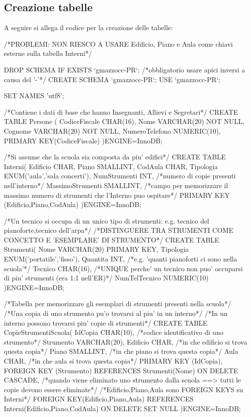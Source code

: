 \documentclass{article}
\begin{document}
\subsection{Creazione tabelle}
\begin{small}
A seguire si allega il codice per la creazione delle tabelle:  \bigskip

\begin{sql}
/*PROBLEMI: NON RIESCO A USARE Edificio, Piano e Aula come chiavi esterne sulla tabella Interni*/

DROP SCHEMA IF EXISTS `gmazzocc-PR`;     /*obbligatorio usare apici inversi a causa del '-'*/
CREATE SCHEMA `gmazzocc-PR`; USE `gmazzocc-PR`;

SET NAMES 'utf8';


/*Contiene i dati di base che hanno Insegnanti, Allievi e Segretari*/
CREATE TABLE Persone (
	CodiceFiscale CHAR(16),
	Nome	      VARCHAR(20) NOT NULL,
	Cognome	      VARCHAR(20) NOT NULL,
	NumeroTelefono NUMERIC(10),
	PRIMARY KEY(CodiceFiscale)
)ENGINE=InnoDB;

/*Si assume che la scuola sia composta da piu' edifici*/
CREATE TABLE Interni(
	Edificio CHAR,
	Piano	 SMALLINT,
	CodAula	 CHAR,
	Tipologia ENUM('aula','sala concerti'), 
	NumStrumenti INT,	/*numero di copie presenti nell'interno*/
	MassimoStrumenti SMALLINT,	/*campo per memorizzare il massimo numero di strumenti che l'Interno puo ospitare*/	
	PRIMARY KEY (Edificio,Piano,CodAula)
)ENGINE=InnoDB;

/*Un tecnico si occupa di un unico tipo di strumenti: e.g. tecnico del pianoforte,tecnico dell'arpa*/
/*DISTINGUERE TRA STRUMENTI COME CONCETTO E 'ESEMPLARE' DI STRUMENTO*/
CREATE TABLE Strumenti(
	Nome 	VARCHAR(20) PRIMARY KEY,
	Tipologia ENUM('portatile','fisso'),
	Quantita INT,          /*e.g. 'quanti pianoforti ci sono nella scuola'*/
	Tecnico CHAR(16),			/*UNIQUE perche' un tecnico non puo' occuparsi di piu' strumenti (era 1:1 nell'ER)*/
	NumTelTecnico NUMERIC(10)		
)ENGINE=InnoDB;

/*Tabella per memorizzare gli esemplari di strumenti presenti nella scuola*/
/*Una copia di uno strumento pu'o trovarsi al piu' in un interno*/
/*In un interno possono trovarsi piu' copie di strumenti*/
CREATE TABLE CopieStrumentiScuola(
	IdCopia   CHAR(10),	/*codice identificativo di uno strumento*/	
	Strumento VARCHAR(20),   
	Edificio  CHAR,       /*in che edificio si trova questa copia*/
	Piano 	  SMALLINT,	/*in che piano si trova questa copia*/
	Aula	  CHAR,		/*in che aula si trova questa copia*/
	PRIMARY KEY (IdCopia),
	FOREIGN KEY (Strumento) REFERENCES Strumenti(Nome) ON DELETE CASCADE,   /*quando viene eliminato uno strumento dalla scuola ==> tutti le copie devono essere 											eliminate*/
	/*Edificio,Piano,Aula sono FOREIGN KEYS su Interni*/
	FOREIGN KEY(Edificio,Piano,Aula) REFERENCES Interni(Edificio,Piano,CodAula) ON DELETE SET NULL
)ENGINE=InnoDB;



\end{sql}
\end{small}
\end{document}

